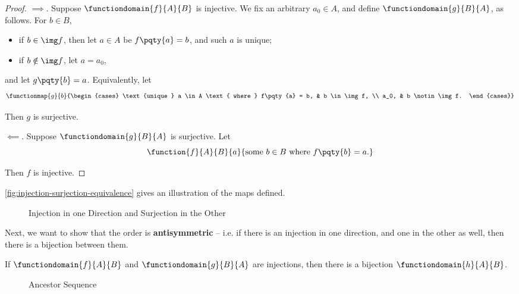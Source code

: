 \begin{proof}
    \(\implies\). Suppose \(\functiondomain{f}{A}{B}\) is injective. We fix an arbitrary \(a_0 \in A\), and define \(\functiondomain{g}{B}{A}\), as follows. For \(b \in B\),
    \begin{itemize}
        \item if \(b \in \img f\), then let \(a \in A\) be \(f \pqty{a} = b\), and such \(a\) is unique; 
        \item if \(b \notin \img f\), let \(a = a_0\),
    \end{itemize}
    and let \(g\pqty{b} = a\). Equivalently, let
    \[
        \functionmap{g}{b}{\begin{cases}
            \text{unique } a \in A \text{ where } f\pqty{a} = b, & b \in \img f, \\
            a_0, & b \notin \img f.
        \end{cases}}
    \]

    Then \(g\) is surjective.

    \(\impliedby\). Suppose \(\functiondomain{g}{B}{A}\) is surjective. Let
    \[
        \function{f}{A}{B}{a}{\text{some } b \in B \text{ where } f \pqty{b} = a.}
    \]

    Then \(f\) is injective.
\end{proof}

\autoref{fig:injection-surjection-equivalence} gives an illustration of the maps defined.

\begin{figure}[ht!]
    \centering
    \caption{Injection in one Direction and Surjection in the Other}
    \label{fig:injection-surjection-equivalence}
\end{figure}

Next, we want to show that the order is \textbf{antisymmetric} -- i.e. if there is an injection in one direction, and one in the other as well, then there is a bijection between them.

\begin{theorem}
    If \(\functiondomain{f}{A}{B}\) and \(\functiondomain{g}{B}{A}\) are injections, then there is a bijection \(\functiondomain{h}{A}{B}\).
\end{theorem}

\begin{figure}[ht!]
    \centering
    \caption{Ancestor Sequence}
    \label{fig:ancestor-sequence}
\end{figure}

